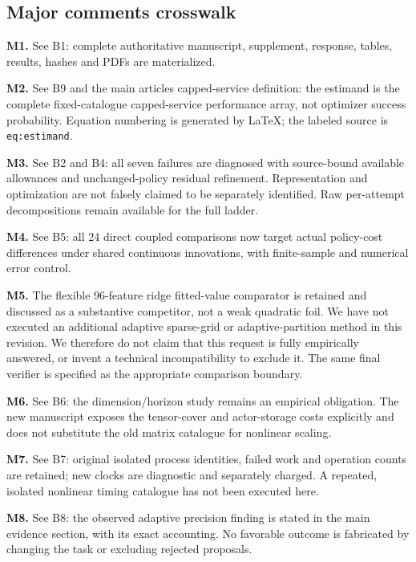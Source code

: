 \documentclass[ecta,nameyear,draft]{econsocart}
\begin{document}
\hypertarget{major-comments-crosswalk}{%
\subsection{Major comments crosswalk}\label{major-comments-crosswalk}}

\textbf{M1.} See B1: complete authoritative manuscript, supplement,
response, tables, results, hashes and PDFs are materialized.

\textbf{M2.} See B9 and the main article\textquotesingle s
capped-service definition: the estimand is the complete fixed-catalogue
capped-service performance array, not optimizer success probability.
Equation numbering is generated by LaTeX; the labeled source is
\nolinkurl{eq:estimand}.

\textbf{M3.} See B2 and B4: all seven failures are diagnosed with
source-bound available allowances and unchanged-policy residual
refinement. Representation and optimization are not falsely claimed to
be separately identified. Raw per-attempt decompositions remain
available for the full ladder.

\textbf{M4.} See B5: all 24 direct coupled comparisons now target actual
policy-cost differences under shared continuous innovations, with
finite-sample and numerical error control.

\textbf{M5.} The flexible 96-feature ridge fitted-value comparator is
retained and discussed as a substantive competitor, not a weak quadratic
foil. We have not executed an additional adaptive sparse-grid or
adaptive-partition method in this revision. We therefore do not claim
that this request is fully empirically answered, or invent a technical
incompatibility to exclude it. The same final verifier is specified as
the appropriate comparison boundary.

\textbf{M6.} See B6: the dimension/horizon study remains an empirical
obligation. The new manuscript exposes the tensor-cover and
actor-storage costs explicitly and does not substitute the old matrix
catalogue for nonlinear scaling.

\textbf{M7.} See B7: original isolated process identities, failed work
and operation counts are retained; new clocks are diagnostic and
separately charged. A repeated, isolated nonlinear timing catalogue has
not been executed here.

\textbf{M8.} See B8: the observed adaptive precision finding is stated
in the main evidence section, with its exact accounting. No favorable
outcome is fabricated by changing the task or excluding rejected
proposals.
\end{document}
